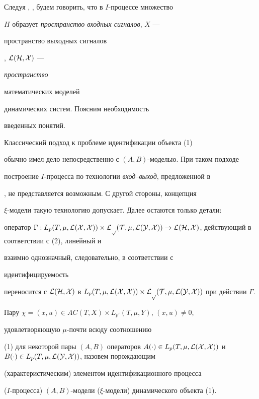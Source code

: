  


Следуя \cite{1}, \cite{2}, будем говорить, что в $I$-процессе множество 


$H$ образует {\it пространство входных сигналов}, $X$ --- {\it 


пространство выходных сигналов}, $\cal L(H,X)$ --- {\it пространство 


математических моделей} динамических систем. Поясним необходимость 


введенных понятий. 


 


Классический подход \cite{10} к проблеме идентификации объекта (1) 


обычно имел дело непосредственно с $(A,B)$-моделью. При таком подходе 


построение $I$-процесса по технологии {\it вход--выход}, предложенной в 


\cite{1}, не представляется возможным. С другой стороны, концепция 


$\xi$-модели такую технологию допускает. Далее остаются только детали: 


оператор $\Gamma: L_p(T,\mu,\cal L(X,X))\times L_p(T,\mu,\cal L(Y,X)) 


\to\cal L(H,X)$, действующий в соответствии с (2), линейный и 


взаимно однозначный, следовательно, в соответствии с \cite{1} {\it 


идентифицируемость} переносится с $\cal L(H,X)$ в $L_p(T,\mu,\cal 


L(X,X))\times L_p(T,\mu,\cal L(Y,X))$ при действии $\Gamma$. 


 


\begin{defn} 


Пару $\chi=(x,u)\in AC(T,X)\times L_{p'}(T,\mu,Y)$, $(x,u)\ne0$, 


удовлетворяющую $\mu$-почти всюду соотношению 


(1) для некоторой пары $(A,B)$ операторов $A(\cdot)\in L_p(T,\mu,\cal 


L(X,X))$ и $B(\cdot)\in L_p(T,\mu,\cal L(Y,X))$, назовем порождающим 


(характеристическим) элементом идентификационного процесса 


($I$-процесса) $(A,B)$-модели ($\xi$-модели) динамического объекта (1). 


\end{defn} 


